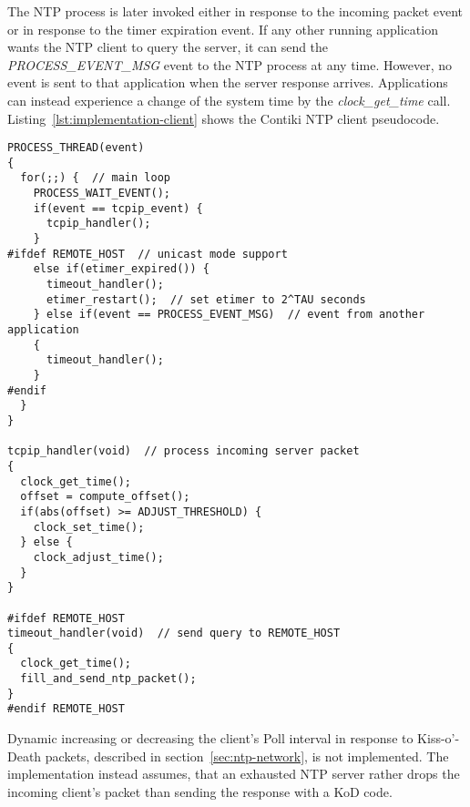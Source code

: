 The NTP process is later invoked either in response to the incoming packet event
or in response to the timer expiration event.
If any other running application wants the NTP client to query the server,
it can send the {\it{PROCESS\_EVENT\_MSG}} event to the NTP process at any time.
However, no event is sent to that application when the server response arrives.
Applications can instead experience a change of
the system time by the {\it{clock\_get\_time}} call.
Listing~\ref{lst:implementation-client} shows the Contiki NTP client pseudocode.
\begin{lstlisting}[caption={NTP client pseudocode},label={lst:implementation-client}]
PROCESS_THREAD(event)
{
  for(;;) {  // main loop
    PROCESS_WAIT_EVENT();
    if(event == tcpip_event) {
      tcpip_handler();
    }
#ifdef REMOTE_HOST  // unicast mode support
    else if(etimer_expired()) {
      timeout_handler();
      etimer_restart();  // set etimer to 2^TAU seconds
    } else if(event == PROCESS_EVENT_MSG)  // event from another application
    {
      timeout_handler();
    }
#endif
  }
}

tcpip_handler(void)  // process incoming server packet
{
  clock_get_time();
  offset = compute_offset();
  if(abs(offset) >= ADJUST_THRESHOLD) {
    clock_set_time();
  } else {
    clock_adjust_time();
  }
}

#ifdef REMOTE_HOST
timeout_handler(void)  // send query to REMOTE_HOST
{
  clock_get_time();
  fill_and_send_ntp_packet();
}
#endif REMOTE_HOST
\end{lstlisting}


Dynamic increasing or decreasing the client's Poll interval in response to
Kiss-o'-Death packets, described in section~\ref{sec:ntp-network}, is not implemented.
The implementation instead assumes, that an exhausted NTP server rather drops the incoming
client's packet than sending the response with a KoD code.


